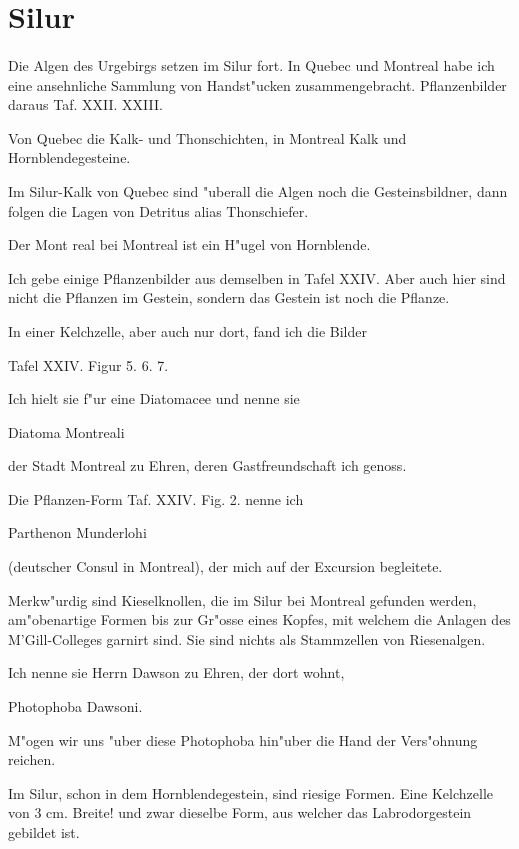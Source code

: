\documentclass[a4paper, 11pt, oneside, german]{article}
\begin{document}
\section{Silur}
\paragraph{}
Die Algen des Urgebirgs setzen im Silur fort. In Quebec und Montreal habe ich eine ansehnliche Sammlung von Handst"ucken zusammengebracht. Pflanzenbilder daraus Taf. XXII. XXIII.

Von Quebec die Kalk- und Thonschichten, in Montreal Kalk und Hornblendegesteine.

Im Silur-Kalk von Quebec sind "uberall die Algen noch die Gesteinsbildner, dann folgen die Lagen von Detritus alias Thonschiefer.

Der Mont real bei Montreal ist ein H"ugel von Hornblende.

Ich gebe einige Pflanzenbilder aus demselben in Tafel XXIV. Aber auch hier sind nicht die Pflanzen im Gestein, sondern das Gestein ist noch die Pflanze.

In einer Kelchzelle, aber auch nur dort, fand ich die Bilder

Tafel XXIV. Figur 5. 6. 7.

Ich hielt sie f"ur eine Diatomacee und nenne sie

Diatoma Montreali

der Stadt Montreal zu Ehren, deren Gastfreundschaft ich genoss.

Die Pflanzen-Form Taf. XXIV. Fig. 2. nenne ich

Parthenon Munderlohi

(deutscher Consul in Montreal), der mich auf der Excursion begleitete.

Merkw"urdig sind Kieselknollen, die im Silur bei Montreal gefunden werden, am"obenartige Formen bis zur Gr"osse eines Kopfes, mit welchem die Anlagen des M'Gill-Colleges garnirt sind. Sie sind nichts als Stammzellen von Riesenalgen.

Ich nenne sie Herrn Dawson zu Ehren, der dort wohnt,

Photophoba Dawsoni.

M"ogen wir uns "uber diese Photophoba hin"uber die Hand der Vers"ohnung reichen.

Im Silur, schon in dem Hornblendegestein, sind riesige Formen. Eine Kelchzelle von 3 cm. Breite! und zwar dieselbe Form, aus welcher das Labrodorgestein gebildet ist.
\end{document}
